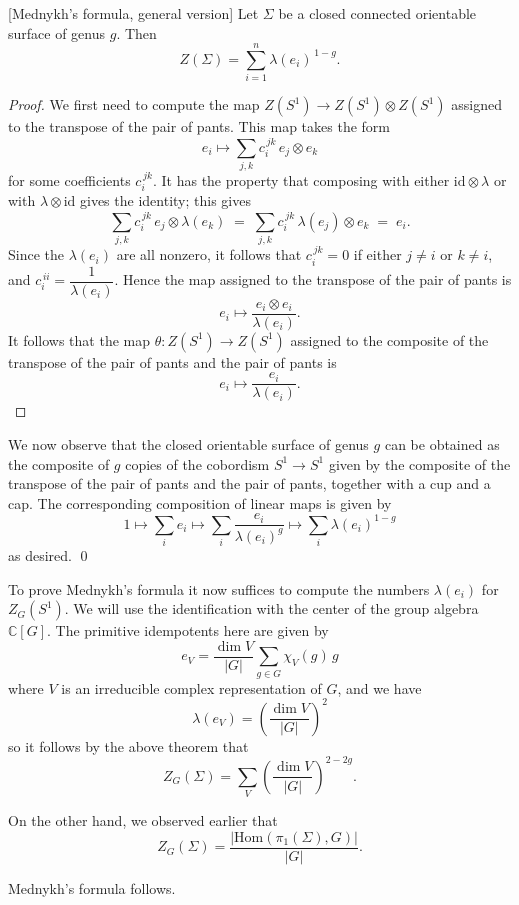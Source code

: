 \documentclass[12pt]{article}
\begin{document}
\begin{theorem}\label{thm:mednykh-general}[Mednykh's formula, general version]
Let $\Sigma$ be a closed connected orientable surface of genus $g$. Then
\[
Z(\Sigma)=\sum_{i=1}^n \lambda(e_i)^{\,1-g}. \tag{30}
\]
\end{theorem}

\begin{proof}
We first need to compute the map $Z(S^1)\to Z(S^1)\otimes Z(S^1)$ assigned to the transpose
of the pair of pants. This map takes the form
\[
e_i \longmapsto \sum_{j,k} c^{\,jk}_i\, e_j\otimes e_k \tag{31}
\]
for some coefficients $c^{\,jk}_i$. It has the property that composing with either
$\mathrm{id}\otimes \lambda$ or with $\lambda\otimes \mathrm{id}$ gives the identity; this gives
\[
\sum_{j,k} c^{\,jk}_i\, e_j\otimes \lambda(e_k)
\;=\;
\sum_{j,k} c^{\,jk}_i\, \lambda(e_j)\otimes e_k
\;=\; e_i. \tag{32}
\]
Since the $\lambda(e_i)$ are all nonzero, it follows that $c^{\,jk}_i=0$ if either $j\neq i$ or $k\neq i$, and
$c^{\,ii}_i=\dfrac{1}{\lambda(e_i)}$. Hence the map assigned to the transpose of the pair of pants is
\[
e_i \longmapsto \frac{e_i\otimes e_i}{\lambda(e_i)}. \tag{33}
\]
It follows that the map $\theta: Z(S^1)\to Z(S^1)$ assigned to the composite of the transpose of
the pair of pants and the pair of pants is
\[
e_i \longmapsto \frac{e_i}{\lambda(e_i)}. \tag{34}
\]
\end{proof}
We now observe that the closed orientable surface of genus $g$ can be obtained as the
composite of $g$ copies of the cobordism $S^1 \to S^1$ given by the composite of the transpose of
the pair of pants and the pair of pants, together with a cup and a cap. The corresponding
composition of linear maps is given by
\[
1 \longmapsto \sum_i e_i \longmapsto \sum_i \frac{e_i}{\lambda(e_i)^g} \longmapsto \sum_i \lambda(e_i)^{1-g} \tag{35}
\]
as desired. \qed

\medskip

To prove Mednykh’s formula it now suffices to compute the numbers $\lambda(e_i)$ for $Z_G(S^1)$.
We will use the identification with the center of the group algebra $\mathbb{C}[G]$. The primitive
idempotents here are given by
\[
e_V = \frac{\dim V}{|G|} \sum_{g\in G} \chi_V(g)\,g \tag{36}
\]
where $V$ is an irreducible complex representation of $G$, and we have
\[
\lambda(e_V) = \left(\frac{\dim V}{|G|}\right)^2 \tag{37}
\]
so it follows by the above theorem that
\[
Z_G(\Sigma) = \sum_V \left(\frac{\dim V}{|G|}\right)^{2-2g}. \tag{38}
\]

On the other hand, we observed earlier that
\[
Z_G(\Sigma) = \frac{|\mathrm{Hom}(\pi_1(\Sigma),G)|}{|G|}. \tag{39}
\]

Mednykh’s formula follows.
\end{document}
